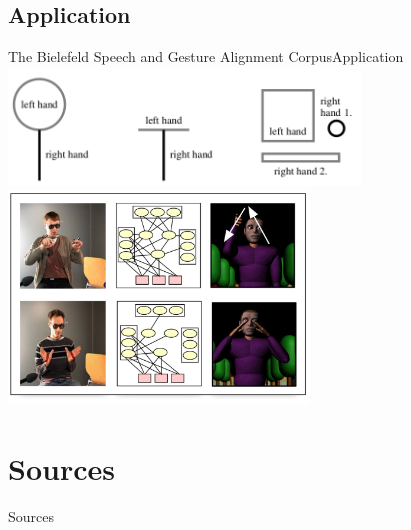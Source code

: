 \documentclass{beamer}
\begin{document}
		\subsection{Application}
			\begin{frame}{The Bielefeld Speech and Gesture Alignment Corpus}{Application}
				\center
						\includegraphics[width=0.7\textwidth]{Types}
						\vspace*{1cm}
						\includegraphics[width=0.6\textwidth]{Bayes}
			\end{frame}	
	
	\section{Sources}
		\begin{frame}[allowframebreaks]{Sources}
			
			\nocite{Bielefeld2010}
			\nocite{Bielefeld2013}
			\nocite{Bergmann2014}
			\nocite{BAS2014}

  			\small
		\end{frame}
	
\end{document}
